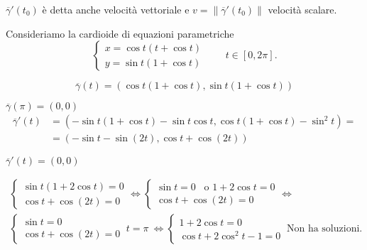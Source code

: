 \begin{definition}
		$\overline{\gamma}'(t_0)$ è detta anche velocità vettoriale e $v= \|\overline{\gamma}'(t_0)\|$ velocità scalare.
\end{definition}


\begin{exbar}
\begin{example}
	Consideriamo la cardioide di equazioni parametriche
	\begin{equation*}
		\begin{cases}
			x=\cos t(t+\cos t)\\
			y=\sin t(1+\cos t)
		\end{cases} \qquad t \in [0,2\pi].
	\end{equation*}
	

	
	\begin{equation*}
		\overline{\gamma}(t)=(\cos t(1+\cos t),\sin t(1+\cos t))
	\end{equation*}
	
	$\overline{\gamma}(\pi)=(0,0)$
	\begin{align*} 
		\overline{\gamma}'(t)
		&=(-\sin t (1+\cos t)-\sin t\cos t, \cos t (1+\cos t)-\sin ^2t )=
		\\
		&=(-\sin t- \sin (2t),\cos t + \cos (2t))
	\end{align*}
	
	$\overline{\gamma}'(t)=(0,0)$
	
	\begin{gather*}
		\begin{cases}
			\sin t (1+2 \cos t)=0\\
			\cos t + \cos (2t)=0
		\end{cases}\Leftrightarrow
		\begin{cases}
			\sin t =0\,\,\, \text{  o  }1+2\cos t =0\\
			\cos t + \cos (2t)=0
		\end{cases}\Leftrightarrow
		\\
		\begin{cases}
			\sin t =0\\
			\cos t + \cos (2t)=0
		\end{cases} \ t=\pi\
		\Leftrightarrow
		\begin{cases}
			1+2\cos t =0\\
			\cos t +2 \cos^2 t-1=0
		\end{cases}
		\ \text{Non ha soluzioni.}
	\end{gather*}
	

\end{example}
\end{exbar}
